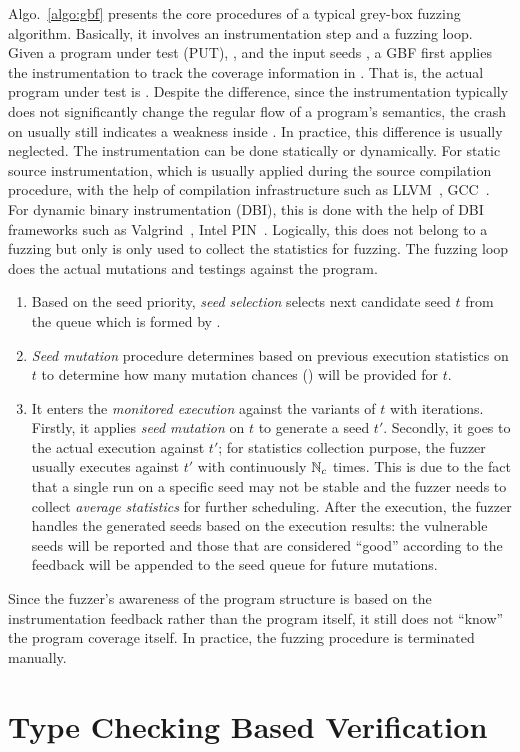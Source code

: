 Algo.~\ref{algo:gbf} presents the core procedures of a typical grey-box fuzzing algorithm. Basically, it involves an instrumentation step and a fuzzing loop.
Given a program under test (PUT), \ProgO, and the input seeds \Seeds, a GBF first applies the instrumentation to track the coverage information in \ProgO. That is, the actual program under test is \Prog. Despite the difference, since the instrumentation typically does not significantly change the regular flow of a program's semantics, the crash on \Prog usually still indicates a weakness inside \ProgO. In practice, this difference is usually neglected.
The instrumentation can be done statically or dynamically. For static source instrumentation, which is usually applied during the source compilation procedure, with the help of compilation infrastructure such as LLVM~\cite{Lattner:2004:LCF:977395.977673}, GCC~\cite{gcc}. For dynamic binary instrumentation (DBI), this is done with the help of DBI frameworks such as Valgrind~\cite{valgrind}, Intel PIN~\cite{pin}. Logically, this does not belong to a fuzzing but only is only used to collect the statistics for fuzzing.
The fuzzing loop does the actual mutations and testings against the program.
\begin{enumerate}
	\item Based on the seed priority, \emph{seed selection} selects next candidate seed $t$ from the queue which is formed by \Seeds.
	\item \emph{Seed mutation} procedure determines based on previous execution statistics on $t$ to determine how many mutation chances (\mutChance) will be provided for $t$.
	\item It enters the \emph{monitored execution} against the variants of $t$ with \mutChance iterations. Firstly, it applies \emph{seed mutation} on $t$ to generate a seed $t'$. Secondly, it goes to the actual execution against $t'$; for statistics collection purpose, the fuzzer usually executes \Prog against $t'$ with continuously $\mathbb{N}_{c}$ times. This is due to the fact that a single run on a specific seed may not be stable and the fuzzer needs to collect \emph{average statistics} for further scheduling. After the execution, the fuzzer handles the generated seeds based on the execution results: the vulnerable seeds will be reported and those that are considered ``good'' according to the feedback will be appended to the seed queue for future mutations.
\end{enumerate}
Since the fuzzer's awareness of the program structure is based on the instrumentation feedback rather than the program itself, it still does not ``know'' the program coverage itself. In practice, the fuzzing procedure is terminated manually.

\section{Type Checking Based Verification}


